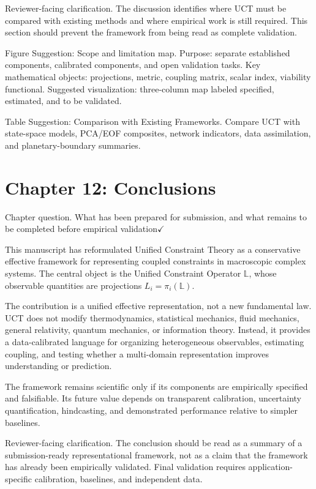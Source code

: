 \documentclass[aps,pre,reprint,superscriptaddress,nofootinbib]{revtex4-2}
\begin{document}
Reviewer-facing clarification. The discussion identifies where UCT must be compared with existing methods and where empirical work is still required. This section should prevent the framework from being read as complete validation.

Figure Suggestion: Scope and limitation map. Purpose: separate established components, calibrated components, and open validation tasks. Key mathematical objects: projections, metric, coupling matrix, scalar index, viability functional. Suggested visualization: three-column map labeled specified, estimated, and to be validated.

Table Suggestion: Comparison with Existing Frameworks. Compare UCT with state-space models, PCA/EOF composites, network indicators, data assimilation, and planetary-boundary summaries.

\section{Chapter 12: Conclusions}

Chapter question. What has been prepared for submission, and what remains to be completed before empirical validation$\checkmark$

This manuscript has reformulated Unified Constraint Theory as a conservative effective framework for representing coupled constraints in macroscopic complex systems. The central object is the Unified Constraint Operator \(\mathbb{L}\), whose observable quantities are projections \(L_i=\pi_i(\mathbb{L})\).

The contribution is a unified effective representation, not a new fundamental law. UCT does not modify thermodynamics, statistical mechanics, fluid mechanics, general relativity, quantum mechanics, or information theory. Instead, it provides a data-calibrated language for organizing heterogeneous observables, estimating coupling, and testing whether a multi-domain representation improves understanding or prediction.

The framework remains scientific only if its components are empirically specified and falsifiable. Its future value depends on transparent calibration, uncertainty quantification, hindcasting, and demonstrated performance relative to simpler baselines.

Reviewer-facing clarification. The conclusion should be read as a summary of a submission-ready representational framework, not as a claim that the framework has already been empirically validated. Final validation requires application-specific calibration, baselines, and independent data.
\end{document}

